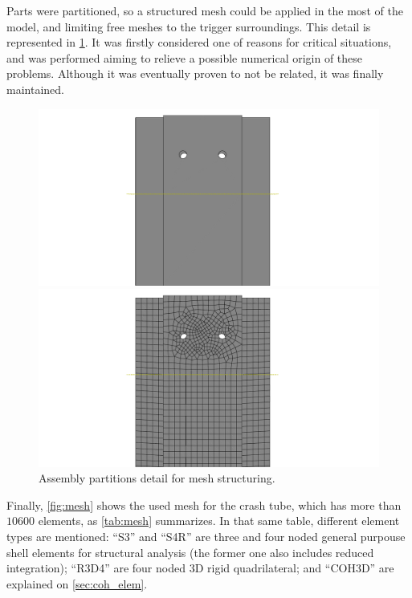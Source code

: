 \documentclass[cmfonts]{witpress}
\begin{document}
Parts were partitioned, so a structured mesh could be applied in the most of the model, and limiting free meshes to the trigger surroundings. This detail is represented in \cref{fig:mesh_part}. It was firstly considered one of reasons for critical situations, and was performed aiming to relieve a possible numerical origin of these problems. Although it was eventually proven to not be related, it was finally maintained.

\begin{figure}
	\centering
	\begin{minipage}[b]{.48\linewidth}
		\centering
		\includegraphics[width=\linewidth]{figures/IMG_CUTRES/assembly_detail_holes}
	\end{minipage}
	\quad
	\begin{minipage}[b]{.48\linewidth}
		\centering
		\includegraphics[width=\linewidth]{figures/IMG_CUTRES/mesh_detail_holes}
	\end{minipage}
\caption{Assembly partitions detail for mesh structuring.}
\label{fig:mesh_part}
\end{figure}

Finally, \cref{fig:mesh} shows the used mesh for the crash tube, which has more than $\num{10600}$ elements, as \cref{tab:mesh} summarizes. In that same table, different element types are mentioned: ``S3'' and ``S4R'' are three and four noded general purpouse shell elements for structural analysis (the former one also includes reduced integration); ``R3D4'' are four noded 3D rigid quadrilateral; and ``COH3D'' are explained on \cref{sec:coh_elem}.
\end{document}
